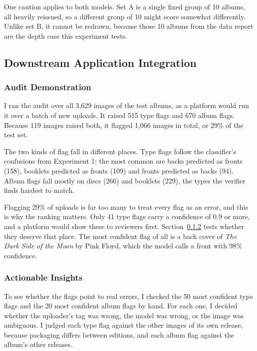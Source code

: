 \documentclass[conference]{IEEEtran}
\begin{document}
One caution applies to both models. Set A is a single fixed group of 10 albums, all heavily reissued, so a different group of 10 might score somewhat differently. Unlike set B, it cannot be redrawn, because those 10 albums from the data report are the depth case this experiment tests.

\subsection{Downstream Application Integration}\label{sec:demo}

\subsubsection{Audit Demonstration}\label{sec:audit}
I ran the audit over all 3,629 images of the test albums, as a platform would run it over a batch of new uploads. It raised 515 type flags and 670 album flags. Because 119 images raised both, it flagged 1,066 images in total, or 29\% of the test set.

The two kinds of flag fall in different places. Type flags follow the classifier's confusions from Experiment 1: the most common are backs predicted as fronts (158), booklets predicted as fronts (109) and fronts predicted as backs (94). Album flags fall mostly on discs (266) and booklets (229), the types the verifier finds hardest to match.

Flagging 29\% of uploads is far too many to treat every flag as an error, and this is why the ranking matters. Only 41 type flags carry a confidence of 0.9 or more, and a platform would show these to reviewers first. Section~\ref{sec:insights} tests whether they deserve that place. The most confident flag of all is a back cover of \textit{The Dark Side of the Moon} by Pink Floyd, which the model calls a front with 98\% confidence.

\subsubsection{Actionable Insights}\label{sec:insights}
To see whether the flags point to real errors, I checked the 50 most confident type flags and the 20 most confident album flags by hand. For each one, I decided whether the uploader's tag was wrong, the model was wrong, or the image was ambiguous. I judged each type flag against the other images of its own release, because packaging differs between editions, and each album flag against the album's other releases.
\end{document}
